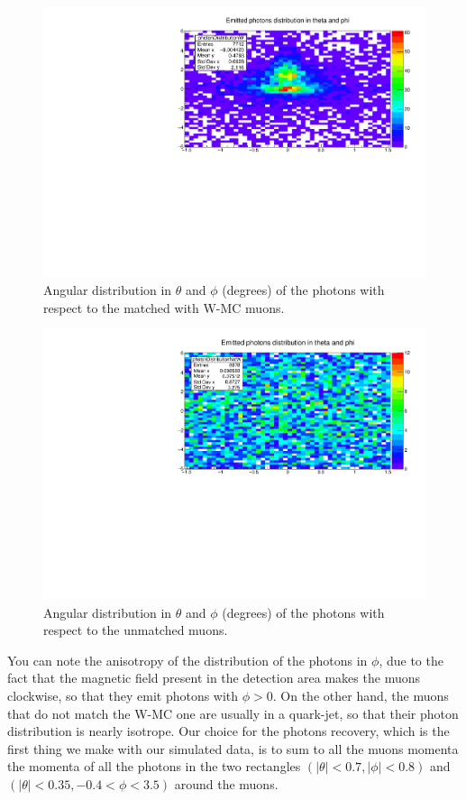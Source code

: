 \begin{figure} [htp]
\centering
\includegraphics[scale=0.7]{04_matchedMuonsPhotons.pdf}
\caption{Angular distribution in $\theta$ and $\phi$ (degrees) of the photons with respect to the matched with W-MC muons.}
\label{04_matchedMuonsPhotons}
\end{figure}

\begin{figure} [htp]
\centering
\includegraphics[scale=0.7]{04_notMatchedMuonsPhotons.pdf}
\caption{Angular distribution in $\theta$ and $\phi$ (degrees) of the photons with respect to the unmatched muons.}
\label{04_notMatchedMuonsPhotons}
\end{figure}

You can note the anisotropy of the distribution of the photons in $\phi$, due to the fact that the magnetic field present in the detection area makes the muons clockwise, so that they emit photons with $\phi > 0$. On the other hand, the muons that do not match the W-MC one are usually in a quark-jet, so that their photon distribution is nearly isotrope.
Our choice for the photons recovery, which is the first thing we make with our simulated data, is to sum to all the muons momenta the momenta of all the photons in the two rectangles $(\lvert\theta\rvert < 0.7, \lvert\phi\rvert < 0.8)$ and $(\lvert\theta\rvert < 0.35, -0.4<\phi < 3.5)$ around the muons.


